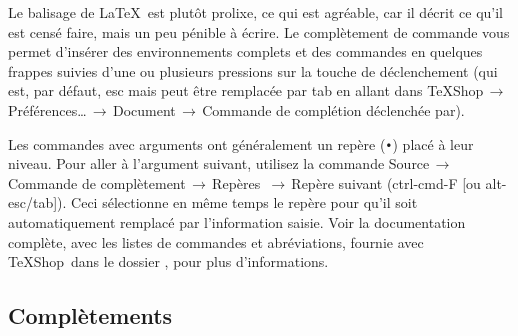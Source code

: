 \documentclass[11pt,french]{article}
\newcommand{\TS}{\textsf{\TeX Shop}}
\newcommand{\cmd}[1]{\textsf{#1}}
\newcommand{\mnu}[1]{\textsf{#1}}
\newcommand{\To}{\,\(\to\)\,}
\begin{document}
Le balisage de \LaTeX\ est plutôt prolixe, ce qui est agréable, car il décrit ce qu'il est censé faire, mais un peu pénible à écrire. Le complètement de commande vous permet d'insérer des environnements complets et des commandes en quelques frappes suivies d'une ou plusieurs pressions  sur la touche de déclenchement (qui est, par défaut, \cmd{esc} mais peut être remplacée par \cmd{tab} en allant dans \mnu{TeXShop}\To\mnu{Préférences…}\To\mnu{Document}\To\mnu{Commande de complétion déclenchée par}).

Les commandes avec arguments ont généralement un repère (\texttt{•}) placé à leur niveau. Pour aller à l'argument suivant, utilisez la commande \mnu{Source}\To\mnu{Commande de complètement}\To\mnu{Repères} \To\mnu{Repère suivant} (\cmd{ctrl-cmd-F} [ou \cmd{alt-esc/tab}]). Ceci sélectionne en même temps le repère pour qu'il soit automatiquement remplacé par l'information saisie. Voir la documentation complète, avec les listes de commandes et abréviations, fournie avec \TS\ dans le dossier , pour plus d'informations.



\subsection{Complètements}
\end{document}
